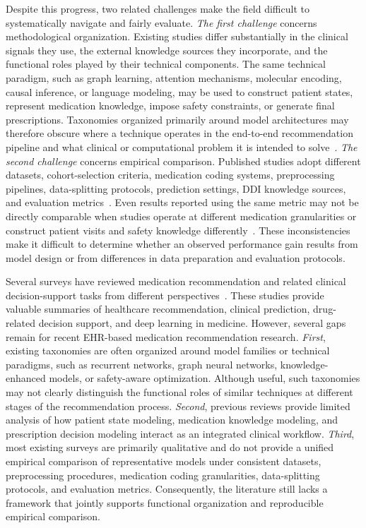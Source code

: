 \documentclass[manuscript,review]{acmart}
\begin{document}
Despite this progress, two related challenges make the field difficult to systematically navigate and fairly evaluate. \textit{The first challenge} concerns methodological organization. Existing studies differ substantially in the clinical signals they use, the external knowledge sources they incorporate, and the functional roles played by their technical components. The same technical paradigm, such as graph learning, attention mechanisms, molecular encoding, causal inference, or language modeling, may be used to construct patient states, represent medication knowledge, impose safety constraints, or generate final prescriptions. Taxonomies organized primarily around model architectures may therefore obscure where a technique operates in the end-to-end recommendation pipeline and what clinical or computational problem it is intended to solve~\cite{ali2023deep,etemadi2023systematic,pato2024survey}. \textit{The second challenge} concerns empirical comparison. Published studies adopt different datasets, cohort-selection criteria, medication coding systems, preprocessing pipelines, data-splitting protocols, prediction settings, DDI knowledge sources, and evaluation metrics~\cite{zangerle2022evaluating,alhijawi2022survey}. Even results reported using the same metric may not be directly comparable when studies operate at different medication granularities or construct patient visits and safety knowledge differently~\cite{sun2023development,ananthakrishnan2025evaluation}. These inconsistencies make it difficult to determine whether an observed performance gain results from model design or from differences in data preparation and evaluation protocols.

Several surveys have reviewed medication recommendation and related clinical decision-support tasks from different perspectives~\cite{sezgin2013systematic,etemadi2023systematic,hors2018analyzing,zhang2018learning,rajkomar2019machine,ngiam2019big,su2020network,zhu2024survey,saxena2024beyond,ali2023deep}. These studies provide valuable summaries of healthcare recommendation, clinical prediction, drug-related decision support, and deep learning in medicine. However, several gaps remain for recent EHR-based medication recommendation research. \textit{First}, existing taxonomies are often organized around model families or technical paradigms, such as recurrent networks, graph neural networks, knowledge-enhanced models, or safety-aware optimization. Although useful, such taxonomies may not clearly distinguish the functional roles of similar techniques at different stages of the recommendation process. \textit{Second}, previous reviews provide limited analysis of how patient state modeling, medication knowledge modeling, and prescription decision modeling interact as an integrated clinical workflow. \textit{Third}, most existing surveys are primarily qualitative and do not provide a unified empirical comparison of representative models under consistent datasets, preprocessing procedures, medication coding granularities, data-splitting protocols, and evaluation metrics. Consequently, the literature still lacks a framework that jointly supports functional organization and reproducible empirical comparison.
\end{document}
